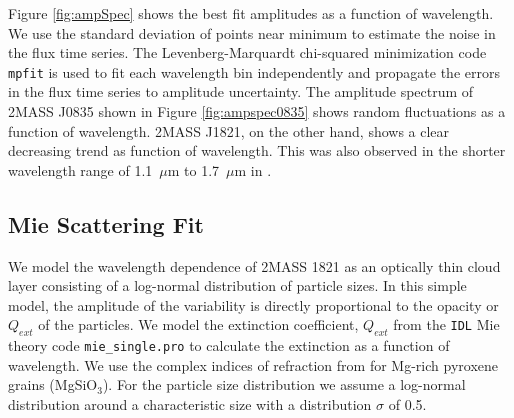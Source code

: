 \documentclass[twocolumn]{aastex6}
\begin{document}
Figure \ref{fig:ampSpec} shows the best fit amplitudes as a function of wavelength.
We use the standard deviation of points near minimum to estimate the noise in the flux time series.
The Levenberg-Marquardt chi-squared minimization code \texttt{mpfit} is used to fit each wavelength bin independently and propagate the errors in the flux time series to amplitude uncertainty.
The amplitude spectrum of 2MASS J0835 shown in Figure \ref{fig:ampspec0835} shows random fluctuations as a function of wavelength.
2MASS J1821, on the other hand, shows a clear decreasing trend as function of wavelength.
This was also observed in the shorter wavelength range of 1.1~$\mu$m to 1.7~$\mu$m in \citet{yang2016exStormsBD}.


\subsection{Mie Scattering Fit}

We model the wavelength dependence of 2MASS 1821 as an optically thin cloud layer consisting of a log-normal distribution of particle sizes.
In this simple model, the amplitude of the variability is directly proportional to the opacity or $Q_{ext}$ of the particles.
We model the extinction coefficient, $Q_{ext}$ from the \texttt{IDL} Mie theory code \texttt{mie\_single.pro} \citep{grainger04} to calculate the extinction as a function of wavelength.
We use the complex indices of refraction from \citet{dorschner95pyrox} for Mg-rich pyroxene grains (MgSiO$_3$).
For the particle size distribution we assume a log-normal distribution around a characteristic size with a distribution $\sigma$ of 0.5.
\end{document}
